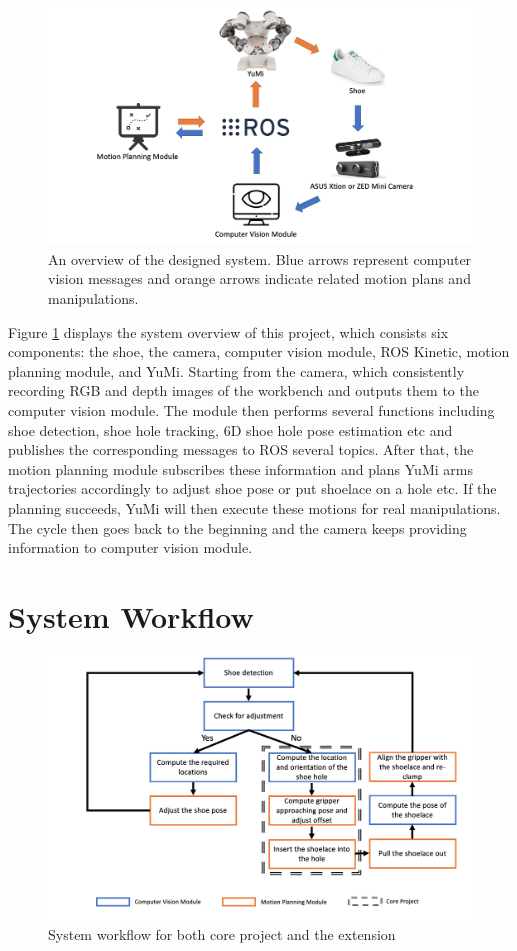\begin{figure}[H]
\centering
\includegraphics[width = \columnwidth]{AnalysisDesign/system.png}
\caption{An overview of the designed system. Blue arrows represent computer vision messages and orange arrows indicate related motion plans and manipulations.}
\label{c4}
\end{figure}

Figure \ref{c4} displays the system overview of this project, which consists six components: the shoe, the camera, computer vision module, ROS Kinetic, motion planning module, and YuMi. Starting from the camera, which consistently recording RGB and depth images of the workbench and outputs them to the computer vision module. The module then performs several functions including shoe detection, shoe hole tracking, 6D shoe hole pose estimation etc and publishes the corresponding messages to ROS several topics. After that, the motion planning module subscribes these information and plans YuMi arms trajectories accordingly to adjust shoe pose or put shoelace on a hole etc. If the planning succeeds, YuMi will then execute these motions for real manipulations. The cycle then goes back to the beginning and the camera keeps providing information to computer vision module.

\section{System Workflow}

\begin{figure}[H]
\centering
\includegraphics[width = \columnwidth]{AnalysisDesign/workflow.png}
\caption{System workflow for both core project and the extension}
\label{workflow}
\end{figure}

